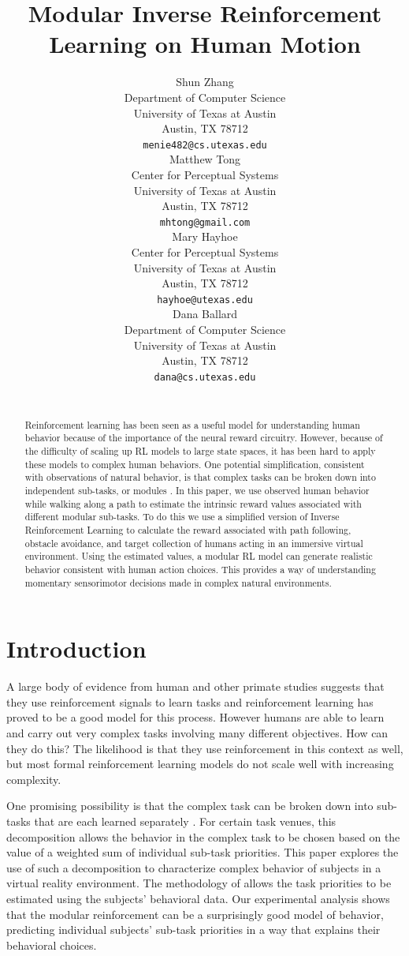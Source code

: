 \documentclass[11pt]{article} %
\title{Modular Inverse Reinforcement Learning on Human Motion}
\author{
Shun Zhang\\
Department of Computer Science\\
University of Texas at Austin\\
Austin, TX 78712 \\
\texttt{menie482@cs.utexas.edu} \\
\And
Matthew Tong \\
Center for Perceptual Systems\\
University of Texas at Austin\\
Austin, TX 78712 \\
\texttt{mhtong@gmail.com} \\
\AND
Mary Hayhoe \\
Center for Perceptual Systems\\
University of Texas at Austin\\
Austin, TX 78712 \\
\texttt{hayhoe@utexas.edu} \\
\And
Dana Ballard \\
Department of Computer Science\\
University of Texas at Austin\\
Austin, TX 78712 \\
\texttt{dana@cs.utexas.edu} \\
\\
}
\begin{document}
\maketitle

\begin{abstract}
Reinforcement learning has been seen as a useful model for understanding human
behavior because of the importance of the neural reward circuitry. However,
because of the difficulty of scaling up RL models to large state spaces, it has
been hard to apply these models to complex human behaviors. One potential
simplification, consistent with observations of natural behavior, is that
complex tasks can be broken down into independent sub-tasks, or modules . In
this paper, we use observed human behavior while walking along a path to
estimate the intrinsic reward values associated with different modular
sub-tasks. To do this we use a simplified version of Inverse Reinforcement
Learning to calculate the reward associated with path following, obstacle
avoidance, and target collection of humans acting in an immersive virtual
environment. Using the estimated values, a modular RL model can generate
realistic behavior consistent with human action choices. This provides a way of
understanding momentary sensorimotor decisions made in complex natural
environments.
\end{abstract}


\startmain %

\section{Introduction}

A large body of evidence from human and other primate studies 
suggests that they use reinforcement signals to learn tasks and reinforcement 
learning has proved to be a good model for this process.
However humans are able to learn and carry out very complex tasks involving 
many different objectives. 
How can they do this? The likelihood is that they use reinforcement in this 
context as well, but most formal reinforcement learning models do not scale 
well with increasing complexity.

One promising possibility is that the complex task can be broken down into 
sub-tasks that are each learned separately \cite{sprague2003multiple,
rothkopf2013modular, dietterich2000hierarchical}. 
For certain task venues, this decomposition allows the behavior in the complex 
task to be chosen based on the value of a weighted sum of individual sub-task priorities.
This paper explores the use of such a decomposition to characterize complex
behavior of subjects in a virtual reality environment. The methodology of
\cite{rothkopf2013modular} allows the task priorities to be estimated using the
subjects' behavioral data. Our experimental analysis shows that the modular reinforcement can be a 
surprisingly good model of behavior, predicting individual subjects' sub-task 
priorities in a way that explains their behavioral choices.
\end{document}

